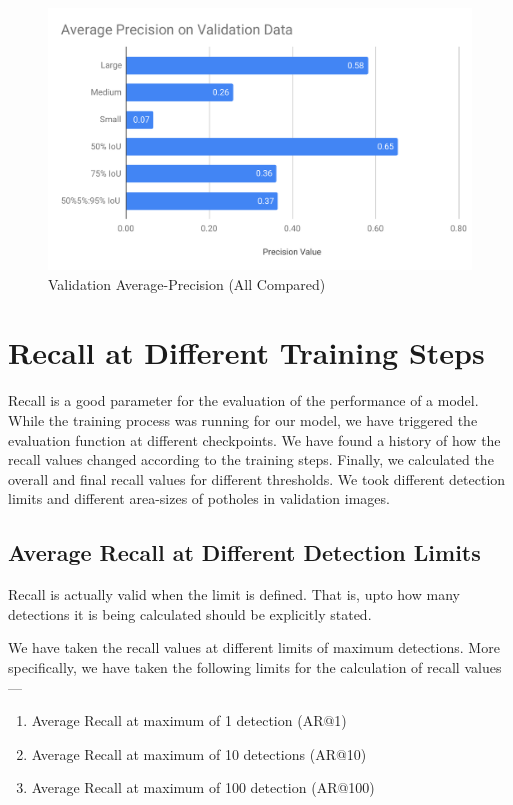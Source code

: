             \begin{figure}
                \centering
                \includegraphics[width=\textwidth]{images/Average Precision on Validation Data.pdf}
                \caption{Validation Average-Precision (All Compared)}
                \label{fig:precisions}
            \end{figure}
            
    \clearpage
    \section{Recall at Different Training Steps}
        Recall is a good parameter for the evaluation of the performance of a model. While the training process was running for our model, we have triggered the evaluation function at different checkpoints. We have found a history of how the recall values changed according to the training steps. Finally, we calculated the overall and final recall values for different thresholds. We took different detection limits and different area-sizes of potholes in validation images.
        
        \subsection{Average Recall at Different Detection Limits}
            Recall is actually valid when the limit is defined. That is, upto how many detections it is being calculated should be explicitly stated.
            
            \vspace{1cm}
            We have taken the recall values at different limits of maximum detections. More specifically, we have taken the following limits for the calculation of recall values---
            \begin{enumerate}
                \item {Average Recall at maximum of 1 detection (AR@1)}
                \item {Average Recall at maximum of 10 detections (AR@10)}
                \item {Average Recall at maximum of 100 detection (AR@100)}
            \end{enumerate}
            
